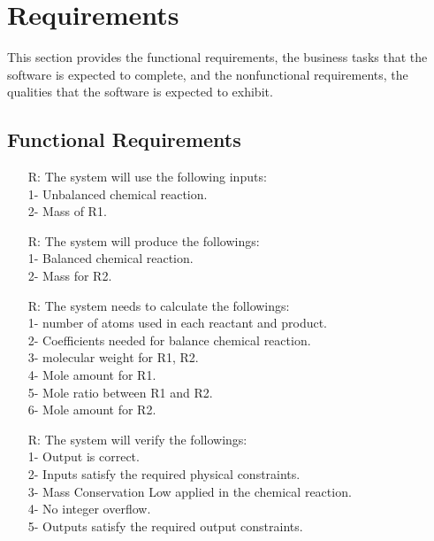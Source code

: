 \documentclass[12pt]{article}
\newcounter{reqnum} %
\begin{document}
\section{Requirements}

This section provides the functional requirements, the business tasks that the
software is expected to complete, and the nonfunctional requirements, the
qualities that the software is expected to exhibit.

\subsection{Functional Requirements}

\noindent \begin{itemize}

\item[R\refstepcounter{reqnum}\thereqnum \label{R_Inputs}:] The system will use the following inputs:\\
1- Unbalanced chemical reaction.\\
2- Mass of R1.\\

\item[R\refstepcounter{reqnum}\thereqnum \label{R_OutputInputs}:]  The system will produce the followings:\\
1- Balanced chemical reaction.\\
 2- Mass for R2. \\

\item[R\refstepcounter{reqnum}\thereqnum \label{R_Calculate}:] The system needs to calculate the followings:\\
1- number of atoms used in each reactant and product.\\
2- Coefficients needed for balance chemical reaction.\\
3- molecular weight for R1, R2.\\
4- Mole  amount for R1.\\
5- Mole ratio between R1 and R2.\\
6- Mole amount for R2.\\
\item[R\refstepcounter{reqnum}\thereqnum \label{R_VerifyOutput}:] The system will verify the followings:\\
1- Output is correct.\\
2-  Inputs satisfy the required physical constraints.\\
3- Mass Conservation Low applied in the chemical reaction.\\
4- No integer overflow. \\
5- Outputs satisfy the required output constraints.\\
\end{itemize}
\end{document}
